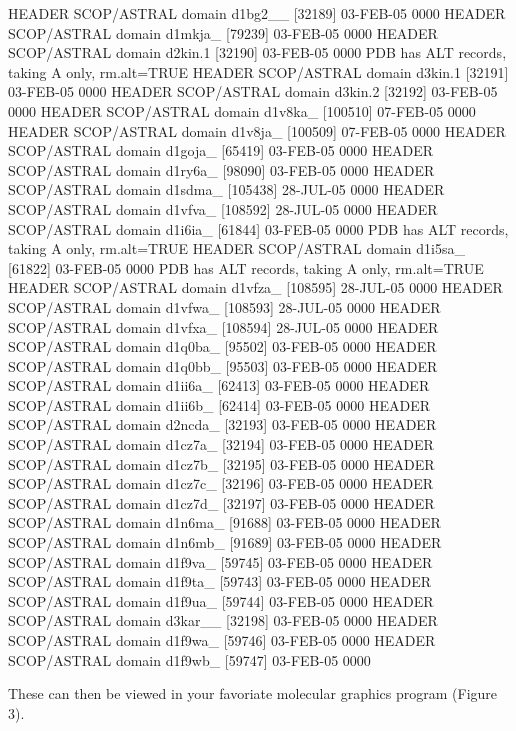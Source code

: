 \documentclass[a4paper]{article}
\begin{document}
\begin{Schunk}
\begin{Soutput}
  HEADER    SCOP/ASTRAL domain d1bg2__ [32189]      03-FEB-05   0000 
  HEADER    SCOP/ASTRAL domain d1mkja_ [79239]      03-FEB-05   0000 
  HEADER    SCOP/ASTRAL domain d2kin.1 [32190]      03-FEB-05   0000 
   PDB has ALT records, taking A only, rm.alt=TRUE
  HEADER    SCOP/ASTRAL domain d3kin.1 [32191]      03-FEB-05   0000 
  HEADER    SCOP/ASTRAL domain d3kin.2 [32192]      03-FEB-05   0000 
  HEADER    SCOP/ASTRAL domain d1v8ka_ [100510]     07-FEB-05   0000 
  HEADER    SCOP/ASTRAL domain d1v8ja_ [100509]     07-FEB-05   0000 
  HEADER    SCOP/ASTRAL domain d1goja_ [65419]      03-FEB-05   0000 
  HEADER    SCOP/ASTRAL domain d1ry6a_ [98090]      03-FEB-05   0000 
  HEADER    SCOP/ASTRAL domain d1sdma_ [105438]     28-JUL-05   0000 
  HEADER    SCOP/ASTRAL domain d1vfva_ [108592]     28-JUL-05   0000 
  HEADER    SCOP/ASTRAL domain d1i6ia_ [61844]      03-FEB-05   0000 
   PDB has ALT records, taking A only, rm.alt=TRUE
  HEADER    SCOP/ASTRAL domain d1i5sa_ [61822]      03-FEB-05   0000 
   PDB has ALT records, taking A only, rm.alt=TRUE
  HEADER    SCOP/ASTRAL domain d1vfza_ [108595]     28-JUL-05   0000 
  HEADER    SCOP/ASTRAL domain d1vfwa_ [108593]     28-JUL-05   0000 
  HEADER    SCOP/ASTRAL domain d1vfxa_ [108594]     28-JUL-05   0000 
  HEADER    SCOP/ASTRAL domain d1q0ba_ [95502]      03-FEB-05   0000 
  HEADER    SCOP/ASTRAL domain d1q0bb_ [95503]      03-FEB-05   0000 
  HEADER    SCOP/ASTRAL domain d1ii6a_ [62413]      03-FEB-05   0000 
  HEADER    SCOP/ASTRAL domain d1ii6b_ [62414]      03-FEB-05   0000 
  HEADER    SCOP/ASTRAL domain d2ncda_ [32193]      03-FEB-05   0000 
  HEADER    SCOP/ASTRAL domain d1cz7a_ [32194]      03-FEB-05   0000 
  HEADER    SCOP/ASTRAL domain d1cz7b_ [32195]      03-FEB-05   0000 
  HEADER    SCOP/ASTRAL domain d1cz7c_ [32196]      03-FEB-05   0000 
  HEADER    SCOP/ASTRAL domain d1cz7d_ [32197]      03-FEB-05   0000 
  HEADER    SCOP/ASTRAL domain d1n6ma_ [91688]      03-FEB-05   0000 
  HEADER    SCOP/ASTRAL domain d1n6mb_ [91689]      03-FEB-05   0000 
  HEADER    SCOP/ASTRAL domain d1f9va_ [59745]      03-FEB-05   0000 
  HEADER    SCOP/ASTRAL domain d1f9ta_ [59743]      03-FEB-05   0000 
  HEADER    SCOP/ASTRAL domain d1f9ua_ [59744]      03-FEB-05   0000 
  HEADER    SCOP/ASTRAL domain d3kar__ [32198]      03-FEB-05   0000 
  HEADER    SCOP/ASTRAL domain d1f9wa_ [59746]      03-FEB-05   0000 
  HEADER    SCOP/ASTRAL domain d1f9wb_ [59747]      03-FEB-05   0000 
\end{Soutput}
\end{Schunk}
These can then be viewed in your favoriate molecular graphics program (Figure 3).
\end{document}
